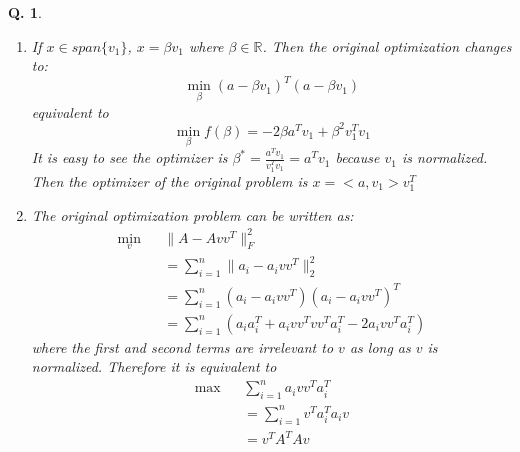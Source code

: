 \documentclass[letterpaper, 11pt]{article}
\newenvironment{problem}{\begin{prob}
                         \rm}{\end{prob}}
\newtheorem{prob}{Q.}
\begin{document}
\begin{problem}
\begin{enumerate}
\item If $x\in span\{v_1\}$, $x = \beta v_1$ where $\beta \in \mathbb{R}$. Then the original optimization changes to:
$$
\min_\beta (a-\beta v_1)^T(a-\beta v_1)
$$
equivalent to
$$
\min_\beta f(\beta) =  -2\beta a^Tv_1 + \beta^2 v_1^Tv_1
$$
It is easy to see the optimizer is $\beta^* = \frac{a^Tv_1}{v_1^Tv_1} = a^Tv_1$ because $v_1$ is normalized. Then the optimizer of the original problem is $x = <a,v_1>v_1^T$

\item The original optimization problem can be written as:
\begin{eqnarray*}
\min_v && \|A-Avv^T\|^2_F \\
&& = \sum_{i=1}^n\|a_i - a_ivv^T\|^2_2 \\
&& = \sum_{i=1}^n(a_i - a_ivv^T)(a_i-a_ivv^T)^T \\
&& = \sum_{i=1}^n(a_ia_i^T + a_ivv^Tvv^Ta_i^T - 2a_ivv^Ta_i^T)
\end{eqnarray*}
where the first and second terms are irrelevant to $v$ as long as $v$ is normalized. Therefore it is equivalent to 
\begin{eqnarray*}
\max && \sum_{i = 1}^n a_ivv^Ta_i^T \\
&& = \sum_{i = 1}^n v^Ta_i^Ta_iv \\
&& = v^TA^TAv
\end{eqnarray*}
\end{enumerate}
\end{problem}
\end{document}
